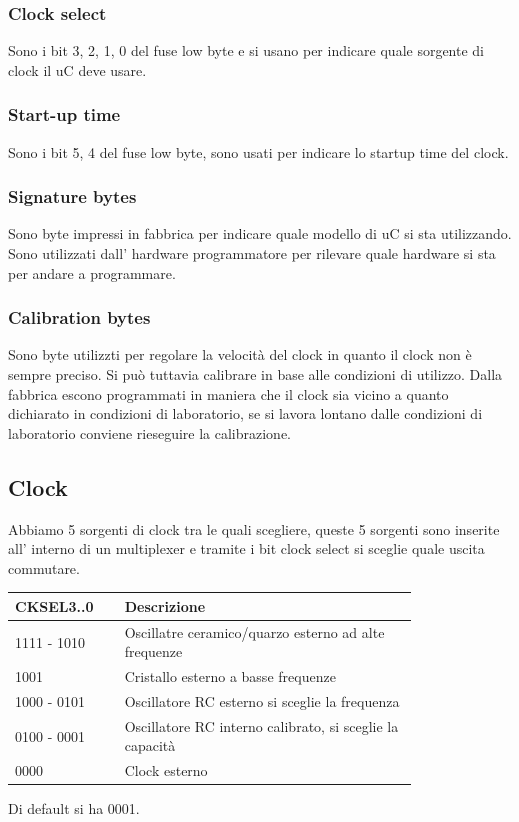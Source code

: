 \subsubsection{Clock select}
Sono i bit 3, 2, 1, 0 del fuse low byte e si usano per indicare quale sorgente di clock il uC deve usare.

\subsubsection{Start-up time}
Sono i bit 5, 4 del fuse low byte, sono usati per indicare lo startup time del clock. 

\subsubsection{Signature bytes}
Sono byte impressi in fabbrica per indicare quale modello di uC si sta utilizzando.
Sono utilizzati dall' hardware programmatore per rilevare quale hardware si sta per andare a programmare.

\subsubsection{Calibration bytes}
Sono byte utilizzti per regolare la velocità del clock in quanto il clock non è sempre preciso.
Si può tuttavia calibrare in base alle condizioni di utilizzo.
Dalla fabbrica escono programmati in maniera che il clock sia vicino a quanto dichiarato in condizioni di laboratorio, se si lavora lontano dalle condizioni di laboratorio conviene rieseguire la calibrazione.

\subsection{Clock}
Abbiamo 5 sorgenti di clock tra le quali scegliere, queste 5 sorgenti sono inserite all' interno di un multiplexer e tramite i bit clock select si sceglie quale uscita commutare.

\begin{table}[ht!]
    \centering
    \begin{tabular}{p{0.2\linewidth} | p{0.6\linewidth}}
        CKSEL3..0 & Descrizione \\
        \hline
        1111 - 1010 &  Oscillatre ceramico/quarzo esterno ad alte frequenze \\
        1001 & Cristallo esterno a basse frequenze \\
        1000 - 0101 & Oscillatore RC esterno si sceglie la frequenza \\
        0100 - 0001 & Oscillatore RC interno calibrato, si sceglie la capacità \\
        0000 & Clock esterno \\
    \end{tabular}
\end{table}
Di default si ha 0001.

